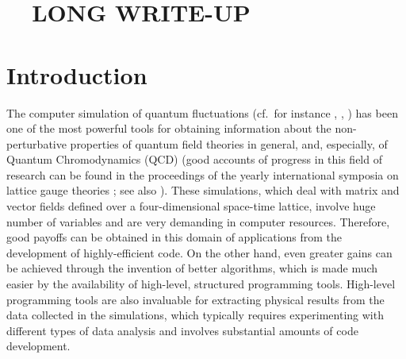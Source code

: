 \section*{ \ \ LONG WRITE-UP}

\section{Introduction}
\label{intro}

The computer simulation of quantum fluctuations (cf.~for instance
\cite{cjr}, \cite{rebbia}, \cite{creutza}) has been one
of the most powerful tools for obtaining information about the
non-perturbative properties of quantum field theories in general,
and, especially, of Quantum Chromodynamics (QCD) (good accounts
of progress in this field of research can be found in the proceedings of 
the yearly international symposia on lattice gauge theories \cite{latconf}; 
see also \cite{rebbib}).  These simulations, which deal with matrix and
vector fields defined over a four-dimensional space-time lattice,
involve huge number of variables and are very demanding in computer
resources.  Therefore, good payoffs can be obtained in this
domain of applications from the development of highly-efficient
code.  On the other hand, even greater
gains can be achieved through the invention of better algorithms,
which is made much easier by the availability
of high-level, structured programming tools.  
High-level programming tools are also invaluable for extracting
physical results from the data collected in the simulations,
which typically requires experimenting with different types of 
data analysis and involves substantial amounts of code development.

